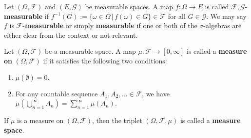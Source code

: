\begin{definition}
    Let $(\Omega, \mathcal{F})$ and $(E, \mathcal{G})$ be measurable spaces.
    A map $f\colon \Omega \to E$ is called $\mathcal{F},\mathcal{G}$-\textbf{measurable}
    if $f^{-1}(G) := \{ \omega\in\Omega \, | \, f(\omega) \in G \} \in \mathcal{F}$
    for all $G\in\mathcal{G}$.  We may say $f$ is $\mathcal{F}$-\textbf{measurable}
    or simply \textbf{measurable} if one or both of the $\sigma$-algebras are either
    clear from the context or not relevant.
\end{definition}

\begin{definition}
    Let $(\Omega, \mathcal{F})$ be a measurable space. A map $\mu : \mathcal{F} \to [0, \infty]$ is called a \textbf{measure on} $(\Omega, \mathcal{F})$ if it satisfies the following two conditions:
    \begin{enumerate}
        \item $\mu(\emptyset) = 0$.
        \item For any countable sequence $A_1, A_2, \dots \in \mathcal{F}$, we have $\mu(\bigcup_{n=1}^{\infty} A_n) = \sum_{n=1}^{\infty} \mu(A_n)$.
    \end{enumerate}
    If $\mu$ is a measure on $(\Omega, \mathcal{F})$, then the triplet $(\Omega, \mathcal{F}, \mu)$ is called a \textbf{measure space}.
\end{definition}

